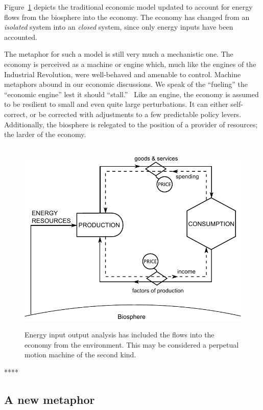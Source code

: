 Figure~\ref{fig:perp_motion_2} depicts the traditional
economic model updated to account for 
energy flows from the biosphere
into the economy.
The economy has changed from an \emph{isolated}
system into an \emph{closed} system,
since only energy inputs have been accounted.

The metaphor for such a model is still very much
a mechanistic one.
The economy is perceived as a machine or engine which,
much like the engines of the Industrial Revolution,
were well-behaved and amenable to control.
Machine metaphors abound in our economic discussions.
We speak of the ``fueling'' the ``economic engine'' 
lest it should ``stall.''~\cite{Liu2012}
Like an engine, the economy is  assumed 
to be resilient to small and even quite large perturbations.  
It can either self-correct, 
or be corrected with adjustments to
a few predictable policy levers. 
Additionally, the biosphere is relegated to the position
of a provider of resources;
the larder of the economy.\cite{Norgaard2010}

\begin{figure}[!ht]
\centering\
\includegraphics[width=\linewidth]{Part_0/Chapter_Introduction/images/Perpetual_motion_2.pdf}
\caption[The traditional model supplemented with energy inputs]{Energy input output 
analysis has included the flows into the economy from the environment.
This may be considered a perpetual motion machine 
of the second kind.}
\label{fig:perp_motion_2}
\end{figure}

****

\subsection{A new metaphor}
\label{sec:new_metaphor}

